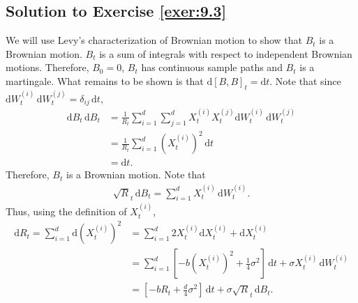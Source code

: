 \documentclass[12pt]{book}
\numberwithin{equation}{chapter}
\theoremstyle{plain}
\numberwithin{theorem}{section}
\theoremstyle{definition}
\numberwithin{exercise}{chapter}
\newcommand{\<}{\langle}
\renewcommand{\>}{\rangle}
\renewcommand{\(}{\left(}
\renewcommand{\)}{\right)}
\renewcommand{\[}{\left[}
\renewcommand{\]}{\right]}
\newcommand\sig{\sigma}
\newcommand\dd{\mathrm{d}}
\begin{document}
\subsection*{Solution to Exercise \ref{exer:9.3}}
We will use Levy's characterization of Brownian motion to show that $B_t$ is a Brownian motion. $B_t$ is a sum of integrals with respect to independent Brownian motions. Therefore, $B_0 = 0$, $B_t$ has continuous sample paths and $B_t$ is a martingale. What remains to be shown is that $\dd [B, B]_t = \dd t$. Note that since $ \dd W_t^{(i)}\, \dd W_t^{(j)} = \delta_{ij}\, \dd t$,
\begin{align}
\dd B_t\, \dd B_t
	&= \frac{1}{ R_t }
		\sum_{i=1}^d \sum_{j=1}^d X_t^{(i)} X_t^{(j)} \dd W_t^{(i)}\, \dd W_t^{(j)}\\
	&= \frac{1}{ R_t } \sum_{i=1}^d \( X_t^{(i)}\)^2\, \dd t \\
	&= \dd t.
\end{align}
Therefore, $B_t$ is a Brownian motion. Note that
\begin{align}
\sqrt R_t \, \dd B_t
	= \sum_{i=1}^d X_t^{(i)}\, \dd W_t^{(i)}.
\end{align}
Thus, using the definition of $X_t^{(i)}$,
\begin{align}
\dd R_t
	= \sum_{i=1}^d \dd \( X_t^{(i)}\)^2
	&= \sum_{i=1}^d 2 X_t^{(i)} \dd X_{t}^{(i)} + \dd X_{t}^{(i)} \\
	&= \sum_{i=1}^d \[ -b (X_t^{(i)})^2 + \frac{1}{4}\sig^2\]\, \dd t + \sig X_t^{(i)}\, \dd W_t^{(i)} \\
	&= \[ -b R_t + \frac{d}{4}\sig^2\]\, \dd t + \sig \sqrt R_t\, \dd B_t.
\end{align}
\end{document}
